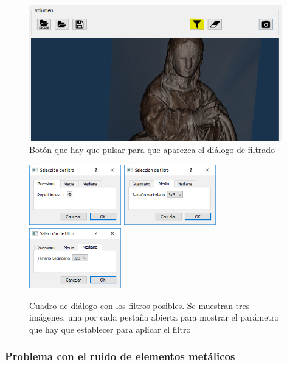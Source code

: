\begin{figure}[H]
	\centering
	\includegraphics[width=11cm]{imagenes/desarrollo/gui-filtro}
	\caption{Botón que hay que pulsar para que aparezca el diálogo de filtrado}
	\label{fig:desarrollo/gui-filtro}
\end{figure}

\begin{figure}[H]
	\centering
	\includegraphics[width=4cm]{imagenes/desarrollo/gui-filtro-gaussiano}
	\includegraphics[width=4cm]{imagenes/desarrollo/gui-filtro-media}
	\includegraphics[width=4cm]{imagenes/desarrollo/gui-filtro-mediana}
	\caption{Cuadro de diálogo con los filtros posibles. Se muestran tres imágenes, una por cada pestaña abierta para mostrar el parámetro que hay que establecer para aplicar el filtro}
	\label{fig:desarrollo/gui-filtro-dialogo}
\end{figure}

\subsubsection{Problema con el ruido de elementos metálicos}

